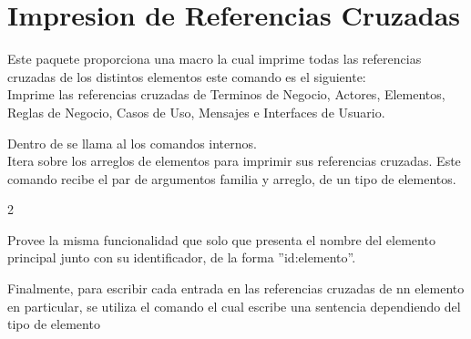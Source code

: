         
\clearpage
\section{Impresion de Referencias Cruzadas}

Este paquete proporciona una macro la cual imprime todas las referencias cruzadas de los distintos elementos este comando es el siguiente:\\

 Imprime las referencias cruzadas de Terminos de Negocio, Actores, Elementos, Reglas de Negocio, Casos de Uso, Mensajes e Interfaces de Usuario.

    \begin{code}
\makeReferenciasCruzadas
    \end{code}

\noindent Dentro de  se llama al los comandos internos.\\

 Itera sobre los arreglos de elementos para imprimir sus referencias cruzadas. Este comando recibe el par de argumentos familia y arreglo, de un tipo de elementos.

    \begin{multicols}{2}
        \begin{code}
        \end{code}
        \columnbreak
        \begin{code}
        \end{code}
    \end{multicols}

 Provee la misma funcionalidad que  solo que presenta el nombre del elemento principal junto con su identificador, de la forma ''id:elemento''.

    \begin{code}
    \end{code}
    

\noindent Finalmente, para escribir cada entrada en las referencias cruzadas de nn elemento en particular, se utiliza el comando {\bf{}} el cual escribe una sentencia dependiendo del tipo de elemento
        
    \begin{code}
    \end{code}
        
